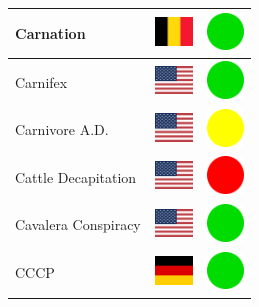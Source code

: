 \documentclass[12pt, a4paper, twoside]{report}
\begin{document}
\begin{center}
\begin{longtable}{|p{5cm}|p{2cm}|p{2cm}|}
 Carnation                                                  & \includegraphics[width=1cm]{../4x3/be} &   \includegraphics[width=1cm]{../likes/y} \\ \hline
 Carnifex                                                   & \includegraphics[width=1cm]{../4x3/us} &   \includegraphics[width=1cm]{../likes/y} \\ \hline
 Carnivore A.D.                                             & \includegraphics[width=1cm]{../4x3/us} &   \includegraphics[width=1cm]{../likes/m} \\ \hline
 Cattle Decapitation                                        & \includegraphics[width=1cm]{../4x3/us} &   \includegraphics[width=1cm]{../likes/n} \\ \hline
 Cavalera Conspiracy                                        & \includegraphics[width=1cm]{../4x3/us} &   \includegraphics[width=1cm]{../likes/y} \\ \hline
 CCCP                                                       & \includegraphics[width=1cm]{../4x3/de} &   \includegraphics[width=1cm]{../likes/y} \\ \hline

\end{longtable}
\end{center}
\end{document}
